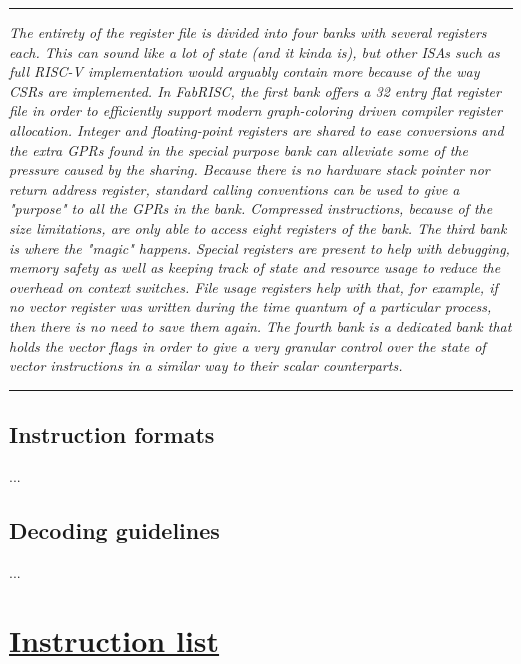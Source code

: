\documentclass{article}
\begin{document}
        \par\noindent\rule{\textwidth}{0.4pt}
        \textit{The entirety of the register file is divided into four banks with several registers each. This can sound like a lot of state (and it kinda is), but other ISAs such as full RISC-V implementation would arguably contain more because of the way CSRs are implemented. In FabRISC, the first bank offers a 32 entry flat register file in order to efficiently support modern graph-coloring driven compiler register allocation. Integer and floating-point registers are shared to ease conversions and the extra GPRs found in the special purpose bank can alleviate some of the pressure caused by the sharing. Because there is no hardware stack pointer nor return address register, standard calling conventions can be used to give a "purpose" to all the GPRs in the bank. Compressed instructions, because of the size limitations, are only able to access eight registers of the bank. The third bank is where the "magic" happens. Special registers are present to help with debugging, memory safety as well as keeping track of state and resource usage to reduce the overhead on context switches. File usage registers help with that, for example, if no vector register was written during the time quantum of a particular process, then there is no need to save them again. The fourth bank is a dedicated bank that holds the vector flags in order to give a very granular control over the state of vector instructions in a similar way to their scalar counterparts.}
        \par\noindent\rule{\textwidth}{0.4pt}

        \subsection{Instruction formats}

            ...

        \subsection{Decoding guidelines}

            ...

    \clearpage


    \section[Instruction list]{\LARGE\underline{Instruction list}}
\end{document}
